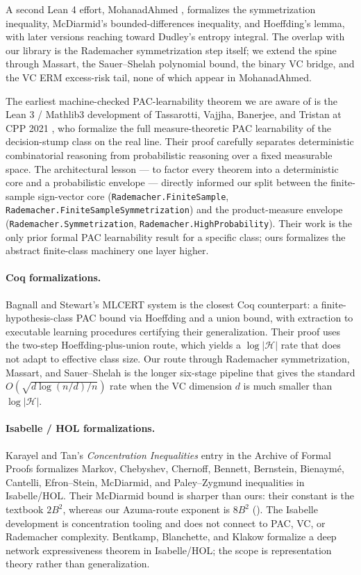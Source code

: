 \documentclass[sigplan,anonymous,review,screen]{acmart}
\newcommand{\Hyp}{\mathcal{H}}
\begin{document}
A second Lean 4 effort, MohanadAhmed \cite{MohanadAhmed2025}, formalizes
the symmetrization inequality, McDiarmid's bounded-differences
inequality, and Hoeffding's lemma, with later versions reaching toward
Dudley's entropy integral. The overlap with our library is the
Rademacher symmetrization step itself; we extend the spine through
Massart, the Sauer--Shelah polynomial bound, the binary VC bridge, and
the VC ERM excess-risk tail, none of which appear in MohanadAhmed.

The earliest machine-checked PAC-learnability theorem we are aware of
is the Lean 3 / Mathlib3 development of Tassarotti, Vajjha, Banerjee,
and Tristan at CPP 2021 \cite{Tassarotti2021}, who formalize the full
measure-theoretic PAC learnability of the decision-stump class on the
real line. Their proof carefully separates deterministic combinatorial
reasoning from probabilistic reasoning over a fixed measurable space.
The architectural lesson --- to factor every theorem into a deterministic
core and a probabilistic envelope --- directly informed our split between
the finite-sample sign-vector core (\texttt{Rademacher.FiniteSample},
\texttt{Rademacher.FiniteSampleSymmetrization}) and the
product-measure envelope (\texttt{Rademacher.Symmetrization},
\texttt{Rademacher.HighProbability}). Their work is the only prior
formal PAC learnability result for a specific class; ours formalizes
the abstract finite-class machinery one layer higher.

\paragraph{Coq formalizations.}
Bagnall and Stewart's MLCERT system \cite{BagnallStewart2019} is the
closest Coq counterpart: a finite-hypothesis-class PAC bound via
Hoeffding and a union bound, with extraction to executable learning
procedures certifying their generalization. Their proof uses the
two-step Hoeffding-plus-union route, which yields a $\log|\Hyp|$ rate
that does not adapt to effective class size. Our route through
Rademacher symmetrization, Massart, and Sauer--Shelah is the longer
six-stage pipeline that gives the standard $O(\sqrt{d \log(n/d)/n})$
rate when the VC dimension $d$ is much smaller than $\log|\Hyp|$.

\paragraph{Isabelle / HOL formalizations.}
Karayel and Tan's \emph{Concentration Inequalities} entry in the Archive
of Formal Proofs \cite{KarayelTan2023} formalizes Markov, Chebyshev,
Chernoff, Bennett, Bernstein, Bienaym\'e, Cantelli, Efron--Stein,
McDiarmid, and Paley--Zygmund inequalities in Isabelle/HOL. Their
McDiarmid bound is sharper than ours: their constant is the textbook
$2B^2$, whereas our Azuma-route exponent is $8B^2$
(). The Isabelle development is concentration
tooling and does not connect to PAC, VC, or Rademacher complexity.
Bentkamp, Blanchette, and Klakow \cite{Bentkamp2019} formalize a deep
network expressiveness theorem in Isabelle/HOL; the scope is
representation theory rather than generalization.
\end{document}
